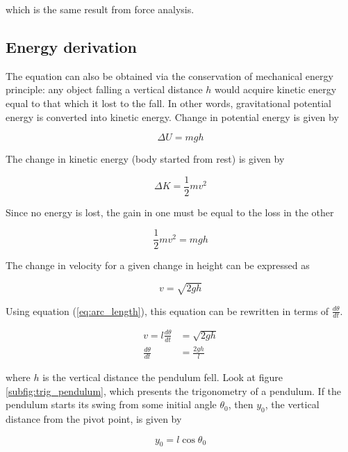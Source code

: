 which is the same result from force analysis.

\subsection{Energy derivation}

The equation can also be obtained via the conservation of mechanical energy
principle: any object falling a vertical distance $h$ would acquire kinetic
energy equal to that which it lost to the fall. In other words, gravitational
potential energy is converted into kinetic energy. Change in potential energy is
given by

\begin{equation*}
  \Delta U = mgh
\end{equation*}

The change in kinetic energy (body started from rest) is given by

\begin{equation*}
  \Delta K = \frac{1}{2}mv^2
\end{equation*}

Since no energy is lost, the gain in one must be equal to the loss in the other

\begin{equation*}
  \frac{1}{2}mv^2 = mgh
\end{equation*}

The change in velocity for a given change in height can be expressed as

\begin{equation*}
  v = \sqrt{2gh}
\end{equation*}

Using equation (\ref{eq:arc_length}), this equation can be rewritten in terms of
$\frac{d\theta}{dt}$.

\begin{align}
  v = l\frac{d\theta}{dt} &= \sqrt{2gh} \nonumber \\
  \frac{d\theta}{dt} &= \frac{2gh}{l} \label{eq:energy_dtheta}
\end{align}

where $h$ is the vertical distance the pendulum fell. Look at figure \ref{subfig:trig_pendulum}, which presents the trigonometry of a pendulum. If the pendulum
starts its swing from some initial angle $\theta_0$, then $y_0$, the vertical
distance from the pivot point, is given by

\begin{equation*}
  y_0 = l\cos\theta_0
\end{equation*}

